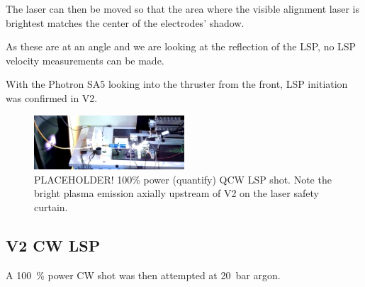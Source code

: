             The laser can then be moved so that the area where the visible alignment laser is brightest matches the center of the electrodes' shadow. 

            


            As these are at an angle and we are looking at the reflection of the LSP, no LSP velocity measurements can be made.

            With the Photron SA5 looking into the thruster from the front, LSP initiation was confirmed in V2. 

            \begin{figure}[!ht]
                \centering
                \includegraphics[width=0.5\textwidth]{assets/4 experiments/holy jesus look at this.png}
                \caption{ PLACEHOLDER! 100\% power (quantify) QCW LSP shot. Note the bright plasma emission axially upstream of V2 on the laser safety curtain.}
            \end{figure}




        \subsection{V2 CW LSP}

            A \qty{100}{\%} power CW shot was then attempted at \qty{20}{bar} argon. 

